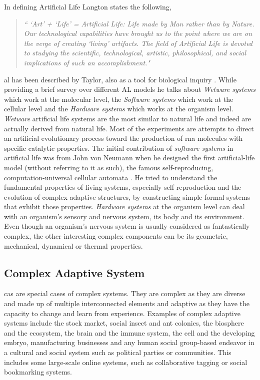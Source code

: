 In defining Artificial Life Langton states the following,

\begin{quote}
\textsl{`` `Art' + `Life' = Artificial Life: Life made by Man rather than by Nature. Our technological capabilities have brought us to the point where we are on the verge of creating `living' artifacts. The field of Artificial Life is devoted to studying the scientific, technological, artistic, philosophical, and social implications of such an accomplishment."}
\end{quote}

\gls{al} has been described by Taylor, also as a tool for biological inquiry \cite{taylor1993}. While providing a brief survey over different AL models he talks about \textsl{Wetware systems} which work at the molecular level, the \textsl{Software systems} which work at the cellular level and the \textsl{Hardware systems} which works at the organism level. \textsl{Wetware} artificial life systems are the most similar to natural life and indeed are actually derived from natural life. Most of the experiments are attempts to direct an artificial evolutionary process toward the production of \gls{rna} molecules with specific catalytic properties. The initial contribution of \textsl{software systems} in artificial life was from John von Neumann when he designed the first artificial-life model (without referring to it as such), the famous self-reproducing, computation-universal cellular automata \cite{neumann1966}. He tried to understand the fundamental properties of living systems, especially self-reproduction and the evolution of complex adaptive structures, by constructing simple formal systems that exhibit those properties. \textsl{Hardware systems} at the organism level can deal with an organism's sensory and nervous system, its body and its environment. Even though an organism's nervous system is usually considered as fantastically complex, the other interesting complex components can be its geometric, mechanical, dynamical or thermal properties. 

\subsection{Complex Adaptive System}
\label{subsec:complex-adaptive-system}
\gls{cas} are special cases of complex systems. They are complex as they are diverse and made up of multiple interconnected elements and adaptive as they have the capacity to change and learn from experience. Examples of complex adaptive systems include the stock market, social insect and ant colonies, the biosphere and the ecosystem, the brain and the immune system, the cell and the developing embryo, manufacturing businesses and any human social group-based endeavor in a cultural and social system such as political parties or communities. This includes some large-scale online systems, such as collaborative tagging or social bookmarking systems.

